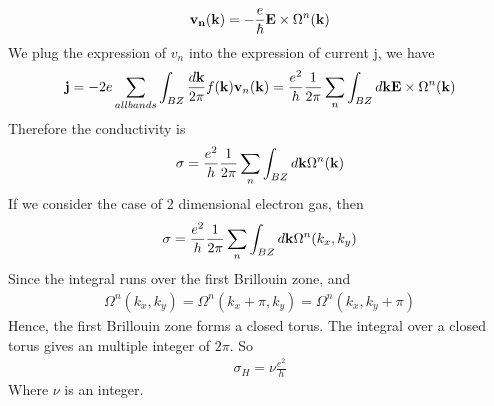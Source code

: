 \documentclass[a4paper]{article}
\begin{document}
\begin{align*}
	{\bf v_n}({\bf k}) = - \frac{e}{\hbar} {\bf E} \times \Omega^{n}({\bf k})
\end{align*}
We plug the expression of $v_n$ into the expression of current j, we have
\begin{align*}
	{\bf j} = -2e\sum_{all bands}\int_{BZ}\frac{d{\bf k}}{2 \pi} f({\bf k}){\bf v}_n({\bf k}) 
	 = \frac{e^2}{h} \frac{1}{2 \pi} \sum_n \int_{BZ} d{\bf k} {\bf E} \times \Omega^n({\bf k})
\end{align*}
Therefore the conductivity is
\begin{align*}
	\sigma = \frac{e^2}{h} \frac{1}{2 \pi} \sum_n \int_{BZ} d{\bf k} \Omega^n({\bf k})
\end{align*}
If we consider the case of 2 dimensional electron gas, then 
\begin{align*}
	\sigma = \frac{e^2}{h} \frac{1}{2 \pi} \sum_n \int_{BZ} d{\bf k} \Omega^n(k_x, k_y)
\end{align*}
Since the integral runs over the first Brillouin zone, and
\begin{align*}
	\Omega^n(k_x, k_y) = \Omega^n(k_x+\pi, k_y) = \Omega^n(k_x, k_y + \pi)
\end{align*}
Hence, the first Brillouin zone forms a closed torus. The integral over a closed torus gives an multiple integer of $2\pi$. So
\begin{align*}
	\sigma_H = \nu \frac{e^2}{h}
\end{align*}
Where $\nu$ is an integer.
\end{document}
